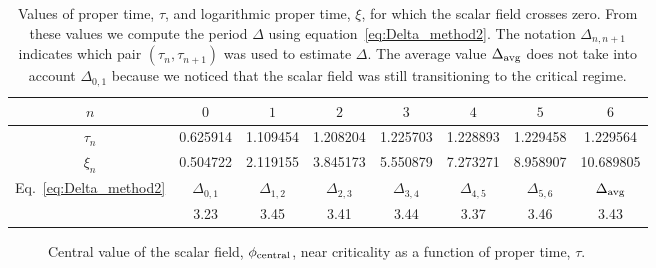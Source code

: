\documentclass[a4paper,11pt]{article}
\newcommand{\D}{\Delta}
\newcommand{\lrpar}[1]{\left( #1 \right)}
\begin{document}
\begin{table}[ht]
  \centering
  \begin{tabular}{c|ccccccc}
    \hline
    \hline
    $n$ & $0$ & $1$ & $2$ & $3$ & $4$ & $5$ & $6$\\
    \hline
    $\tau_{n}$ & 0.625914 & 1.109454 & 1.208204 & 1.225703 & 1.228893 & 1.229458 & 1.229564\\
    $\xi_{n}$ & 0.504722 & 2.119155 & 3.845173 & 5.550879 & 7.273271 & 8.958907 & 10.689805\\
    \hline
    \hline
    \multirow{2}{*}{Eq.~\eqref{eq:Delta_method2}} & $\D_{0,1}$ & $\D_{1,2}$ & $\D_{2,3}$ & $\D_{3,4}$ & $\D_{4,5}$ & $\D_{5,6}$ & $\D_{\rm avg}$\\
    \cline{2-8}
    & 3.23 & 3.45 & 3.41 & 3.44 & 3.37 & 3.46 & 3.43\\
    \hline
    \hline
  \end{tabular}
  \caption[Values of proper time and logarithmic proper time used to estimate the universal oscillation period $\D$.]{Values of proper time, $\tau$, and logarithmic proper time, $\xi$, for which the scalar field crosses zero. From these values we compute the period $\Delta$ using equation~\eqref{eq:Delta_method2}. The notation $\Delta_{n,n+1}$ indicates which pair $\lrpar{\tau_{n},\tau_{n+1}}$ was used to estimate $\Delta$. The average value $\D_{\rm avg}$ does not take into account $\D_{0,1}$ because we noticed that the scalar field was still transitioning to the critical regime.}
  \label{tab:accumulation_time}
\end{table}

\begin{figure}[ht]
  \centering
  
  \caption[Central value of the scalar field, $\phi_{\rm central}$, near criticality as a function of proper time, $\tau$.]{Central value of the scalar field, $\phi_{\rm central}$, near criticality as a function of proper time, $\tau$.}
  \label{fig:accumulation_tau}
\end{figure}
\end{document}
